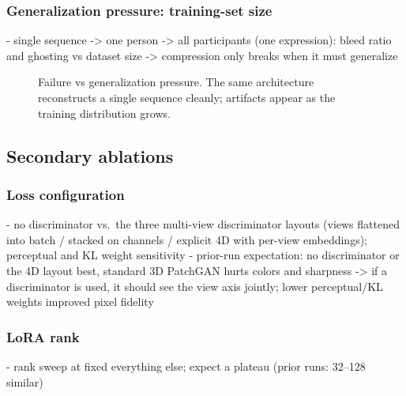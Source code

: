 \subsubsection{Generalization pressure: training-set size}

- single sequence -> one person -> all participants (one expression): bleed ratio and ghosting vs dataset size -> compression only breaks when it must generalize

\begin{figure}[t]
\centering
{}
\caption{Failure vs generalization pressure. The same architecture reconstructs a single sequence cleanly; artifacts appear as the training distribution grows.}
\label{fig:datascale}
\end{figure}

\subsection{Secondary ablations}

\subsubsection{Loss configuration}
- no discriminator vs.\ the three multi-view discriminator layouts (views flattened into batch / stacked on channels / explicit 4D with per-view embeddings); perceptual and KL weight sensitivity
- prior-run expectation: no discriminator or the 4D layout best, standard 3D PatchGAN hurts colors and sharpness -> if a discriminator is used, it should see the view axis jointly; lower perceptual/KL weights improved pixel fidelity

\subsubsection{LoRA rank}
- rank sweep at fixed everything else; expect a plateau (prior runs: 32--128 similar)


